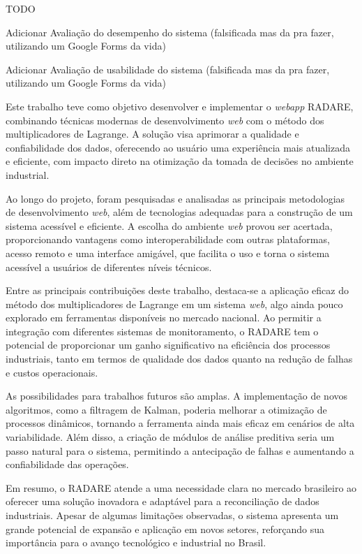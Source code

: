 TODO

Adicionar Avaliação do desempenho do sistema (falsificada mas da pra fazer, utilizando um Google Forms da vida)

Adicionar Avaliação de usabilidade do sistema (falsificada mas da pra fazer, utilizando um Google Forms da vida)


\label{Cap:Conclusao}

Este trabalho teve como objetivo desenvolver e implementar o \textit{webapp} RADARE, combinando técnicas modernas de desenvolvimento \textit{web} com o método dos multiplicadores de Lagrange. A solução visa aprimorar a qualidade e confiabilidade dos dados, oferecendo ao usuário uma experiência mais atualizada e eficiente, com impacto direto na otimização da tomada de decisões no ambiente industrial.

Ao longo do projeto, foram pesquisadas e analisadas as principais metodologias de desenvolvimento \textit{web}, além de tecnologias adequadas para a construção de um sistema acessível e eficiente. A escolha do ambiente \textit{web} provou ser acertada, proporcionando vantagens como interoperabilidade com outras plataformas, acesso remoto e uma interface amigável, que facilita o uso e torna o sistema acessível a usuários de diferentes níveis técnicos.

Entre as principais contribuições deste trabalho, destaca-se a aplicação eficaz do método dos multiplicadores de Lagrange em um sistema \textit{web}, algo ainda pouco explorado em ferramentas disponíveis no mercado nacional. Ao permitir a integração com diferentes sistemas de monitoramento, o RADARE tem o potencial de proporcionar um ganho significativo na eficiência dos processos industriais, tanto em termos de qualidade dos dados quanto na redução de falhas e custos operacionais.

As possibilidades para trabalhos futuros são amplas. A implementação de novos algoritmos, como a filtragem de Kalman, poderia melhorar a otimização de processos dinâmicos, tornando a ferramenta ainda mais eficaz em cenários de alta variabilidade. Além disso, a criação de módulos de análise preditiva seria um passo natural para o sistema, permitindo a antecipação de falhas e aumentando a confiabilidade das operações.

Em resumo, o RADARE atende a uma necessidade clara no mercado brasileiro ao oferecer uma solução inovadora e adaptável para a reconciliação de dados industriais. Apesar de algumas limitações observadas, o sistema apresenta um grande potencial de expansão e aplicação em novos setores, reforçando sua importância para o avanço tecnológico e industrial no Brasil.